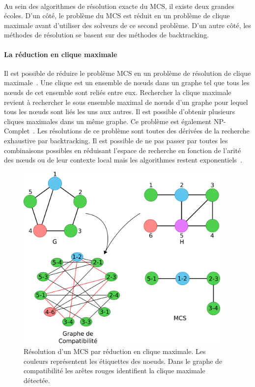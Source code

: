 \documentclass[12pt,french,twoside]{report}
\begin{document}
\paragraph{}Au sein des algorithmes de résolution exacte du MCS, il existe deux grandes écoles.
D'un côté, le problème du MCS est réduit en un problème de clique maximale avant d'utiliser des solveurs de ce second problème.
D'un autre côté, les méthodes de résolution se basent sur des méthodes de backtracking.



\paragraph{La réduction en clique maximale}
Il est possible de réduire le problème MCS en un problème de résolution de clique maximale~\cite{pelillo_matching_1999,grosso_simple_2008,rahman_small_2009}.
Une clique est un ensemble de n\oe{}uds dans un graphe tel que tous les n\oe{}uds de cet ensemble sont reliés entre eux.
Rechercher la clique maximale revient à rechercher le sous ensemble maximal de n\oe{}uds d'un graphe pour lequel tous les n\oe{}uds sont liés les uns aux autres.
Il est possible d'obtenir plusieurs cliques maximales dans un même graphe.
Ce problème est également NP-Complet~\cite{akkoyunlu_enumeration_1973}.
Les résolutions de ce problème sont toutes des dérivées de la recherche exhaustive par backtracking.
Il est possible de ne pas passer par toutes les combinaisons possibles en réduisant l'espace de recherche en fonction de l'arité des n\oe{}uds ou de leur contexte local mais les algorithmes restent exponentiels~\cite{tomita_worst-case_2004}.

\begin{figure}[!ht]
  \begin{center}
    \includegraphics[width=400px]{Figures/s2m/MCS-SI/clique_solve.png}
    \caption{\label{clique_solve_fig}Résolution d'un MCS par réduction en clique maximale.
    Les couleurs représentent les étiquettes des noeuds.
    Dans le graphe de compatibilité les arêtes rouges identifient la clique maximale détectée.}
  \end{center}
\end{figure}
\end{document}
